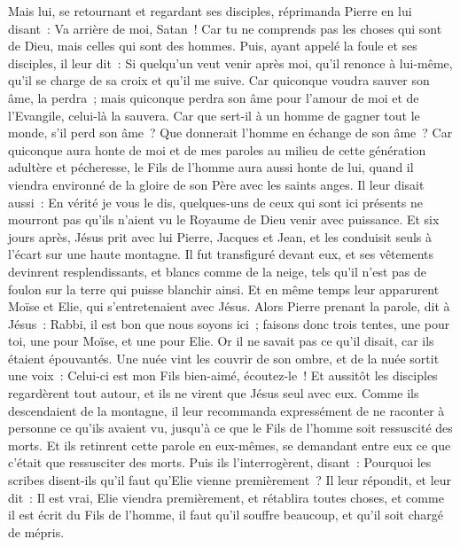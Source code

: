 \begin{multicols}{2}
Mais lui, se retournant et regardant ses disciples, réprimanda Pierre en lui disant~: Va arrière de moi, Satan~! Car tu ne comprends pas les choses qui sont de Dieu, mais celles qui sont des hommes.
Puis, ayant appelé la foule et ses disciples, il leur dit~: Si quelqu'un veut venir après moi, qu'il renonce à lui-même, qu'il se charge de sa croix et qu'il me suive.
Car quiconque voudra sauver son âme, la perdra~; mais quiconque perdra son âme pour l'amour de moi et de l'Evangile, celui-là la sauvera.
Car que sert-il à un homme de gagner tout le monde, s'il perd son âme~?
Que donnerait l'homme en échange de son âme~?
Car quiconque aura honte de moi et de mes paroles au milieu de cette génération adultère et pécheresse, le Fils de l'homme aura aussi honte de lui, quand il viendra environné de la gloire de son Père avec les saints anges.
\VerseOne{}Il leur disait aussi~: En vérité je vous le dis, quelques-uns de ceux qui sont ici présents ne mourront pas qu'ils n'aient vu le Royaume de Dieu venir avec puissance.
Et six jours après, Jésus prit avec lui Pierre, Jacques et Jean, et les conduisit seuls à l'écart sur une haute montagne. Il fut transfiguré devant eux,
et ses vêtements devinrent resplendissants, et blancs comme de la neige, tels qu'il n'est pas de foulon sur la terre qui puisse blanchir ainsi.
Et en même temps leur apparurent Moïse et Elie, qui s'entretenaient avec Jésus.
Alors Pierre prenant la parole, dit à Jésus~: Rabbi, il est bon que nous soyons ici~; faisons donc trois tentes, une pour toi, une pour Moïse, et une pour Elie.
Or il ne savait pas ce qu'il disait, car ils étaient épouvantés.
Une nuée vint les couvrir de son ombre, et de la nuée sortit une voix~: Celui-ci est mon Fils bien-aimé, écoutez-le~!
Et aussitôt les disciples regardèrent tout autour, et ils ne virent que Jésus seul avec eux.
Comme ils descendaient de la montagne, il leur recommanda expressément de ne raconter à personne ce qu'ils avaient vu, jusqu'à ce que le Fils de l'homme soit ressuscité des morts.
Et ils retinrent cette parole en eux-mêmes, se demandant entre eux ce que c'était que ressusciter des morts.
Puis ils l'interrogèrent, disant~: Pourquoi les scribes disent-ils qu'il faut qu'Elie vienne premièrement~?
Il leur répondit, et leur dit~: Il est vrai, Elie viendra premièrement, et rétablira toutes choses, et comme il est écrit du Fils de l'homme, il faut qu'il souffre beaucoup, et qu'il soit chargé de mépris.

\end{multicols}
